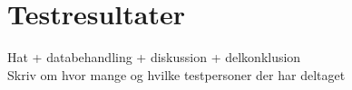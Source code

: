\chapter{Testresultater}
\label{Testresultater}
%
Hat + databehandling + diskussion + delkonklusion \\
Skriv om hvor mange og hvilke testpersoner der har deltaget
%

